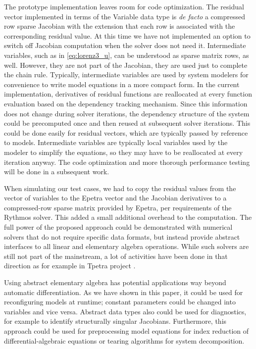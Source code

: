 \documentclass[10pt]{ijnam}
\theoremstyle{definition}
\begin{document}
The prototype implementation leaves room for code optimization. The 
residual vector implemented in terms of the Variable data type is \textit{de facto}
a compressed row sparse Jacobian with the extension that each row
is associated with the corresponding residual value. 
At this time we have not implemented an option to switch off Jacobian computation
when the solver does not need it.
Intermediate variables, such as
 in \eqref{eq:lorenz3_u}, can be understood as sparse matrix rows, as well. 
However, they are not part of the Jacobian, they are used just to complete the 
chain rule. Typically, intermediate variables are used by system modelers 
for convenience to write model equations in a more compact form. In the current 
implementation, derivatives of residual functions are reallocated at every 
function evaluation based on the dependency tracking mechanism. Since this information
does not change during solver iterations, the dependency structure of the system 
could be precomputed once and then reused at subsequent solver iterations.
This could be done easily for residual vectors, which are typically passed by 
reference to models. Intermediate variables are typically local variables used by
the modeler to simplify the equations, so they may have to be reallocated at every 
iteration anyway. The code optimization and more thorough performance testing will be 
done in a subsequent work.

When simulating our test cases, we had to copy the residual values from the 
vector of variables to the Epetra vector and the Jacobian derivatives to a
compressed-row sparse matrix provided by Epetra, per requirements of the Rythmos solver.
This added a small additional overhead to the computation. The full power
of the proposed approach could be demonstrated with numerical solvers that 
do not require specific data formats, but instead provide abstract interfaces 
to all linear and elementary algebra operations. While such solvers are 
still not part of the mainstream, a lot of activities have been done in that 
direction as for example in Tpetra project \cite{baker2012}.

Using abstract elementary algebra has potential applications way beyond 
automatic differentiation. As we have shown in this paper, it could be 
used for reconfiguring models at runtime; constant parameters could be 
changed into variables and vice versa. Abstract data types also 
could be used for diagnostics, for example to identify structurally singular 
Jacobians. Furthermore, this approach could be used for preprocessing 
model equations for index reduction of differential-algebraic equations or 
tearing algorithms for system decomposition. 
\end{document}
